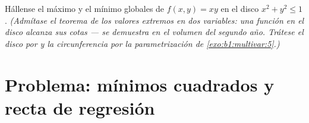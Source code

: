 \begin{exercise}[$\star\star\star$]\label{exo:b1:multivar:12}
Hállense el máximo y el mínimo globales de $f(x, y) = xy$ en el disco
 $x^2 + y^2 \leq 1$. \emph{(Admítase el teorema de los valores
extremos en dos variables: una función  en el disco 
alcanza sus cotas --- se demuestra en el volumen del segundo año. Trátese el
disco  por  y la circunferencia  por la
parametrización de \cref{exo:b1:multivar:5}.)}
\end{exercise}

\section{Problema: mínimos cuadrados y recta de regresión}

